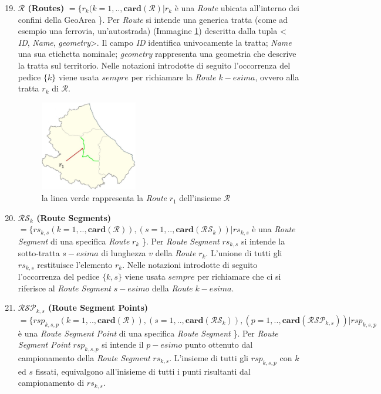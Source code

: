 \begin{enumerate}
	\setcounter{enumi}{18}
	\item \textbf{$ \mathcal{R} $ (Routes)} $ = \{r_k(k=1,..,\mathbf{card}(\mathcal{R}) | r_k $ è una \textit{Route} ubicata all'interno dei confini della  GeoArea \}. Per \textit{Route} si intende una generica tratta (come ad esempio una ferrovia, un'autostrada) (Immagine \ref{img:route}) descritta dalla tupla < \textit{ID}, \textit{Name}, \textit{geometry}>. Il campo \textit{ID} identifica univocamente la tratta; \textit{Name} una sua etichetta nominale; \textit{geometry} rappresenta una geometria che descrive la tratta sul territorio. Nelle notazioni introdotte di seguito l'occorrenza del pedice $\{k\}$ viene usata $sempre$ per richiamare la \textit{Route} $k-esima$, ovvero alla tratta $r_k$ di $ \mathcal{R} $.
	
		\begin{figure}[h]
		\centering
		\includegraphics[width=0.4\textwidth]{images/routes1}
		\caption{la linea verde rappresenta la \textit{Route} $r_1$ dell'insieme $ \mathcal{R} $}
		\label{img:route}
		\end{figure}
	
	\item \textbf{$ \mathcal{RS}_k $ (Route Segments)} $ = \{rs_{k,s}(k=1,..,\mathbf{card}(\mathcal{R})),(s=1,..,\mathbf{card}(\mathcal{RS}_k))  | rs_{k,s} $ è una \textit{Route Segment} di una specifica \textit{Route} $r_k$ \}. Per \textit{Route Segment} $rs_{k,s}$ si intende la sotto-tratta $s-esima$ di lunghezza $v$ della \textit{Route} $r_k$. L'unione di tutti gli $rs_{k,s}$ restituisce l'elemento $r_k$. Nelle notazioni introdotte di seguito l'occorrenza del pedice $\{k,s\}$ viene usata $sempre$ per richiamare che ci si riferisce al \textit{Route Segment} $s-esimo$ della \textit{Route} $k-esima$.
		
	\item \textbf{$ \mathcal{RSP}_{k,s} $ (Route Segment Points)} $ = \{rsp_{k,s,p}(k=1,..,\mathbf{card}(\mathcal{R})),(s=1,..,\mathbf{card}(\mathcal{RS}_k)),(p=1,..,\mathbf{card}(\mathcal{RSP}_{k,s}))  | rsp_{k,s,p} $ è una \textit{Route Segment Point} di una specifica \textit{Route Segment} \}. Per \textit{Route Segment Point} $rsp_{k,s,p}$ si intende il $p-esimo$ punto ottenuto dal campionamento della \textit{Route Segment} $rs_{k,s}$. L'insieme di tutti gli $rsp_{k,s,p}$ con $k$ ed $s$ fissati, equivalgono all'inisieme di tutti i punti risultanti dal campionamento di $rs_{k,s}$.
	
\end{enumerate}

